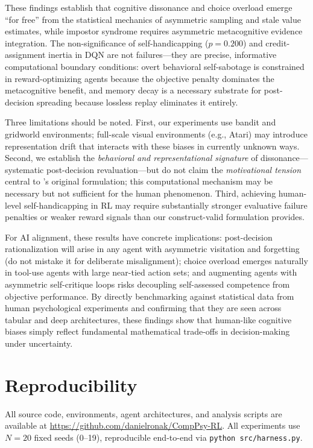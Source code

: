 \documentclass[conference]{IEEEtran}
\begin{document}
These findings establish that cognitive dissonance and choice overload emerge ``for free'' from the statistical mechanics of asymmetric sampling and stale value estimates, while impostor syndrome requires asymmetric metacognitive evidence integration. The non-significance of self-handicapping ($p=0.200$) and credit-assignment inertia in DQN are not failures---they are precise, informative computational boundary conditions: overt behavioral self-sabotage is constrained in reward-optimizing agents because the objective penalty dominates the metacognitive benefit, and memory decay is a necessary substrate for post-decision spreading because lossless replay eliminates it entirely.

Three limitations should be noted. First, our experiments use bandit and gridworld environments; full-scale visual environments (e.g., Atari) may introduce representation drift that interacts with these biases in currently unknown ways. Second, we establish the \textit{behavioral and representational signature} of dissonance---systematic post-decision revaluation---but do not claim the \textit{motivational tension} central to \citet{festinger1957theory}'s original formulation; this computational mechanism may be necessary but not sufficient for the human phenomenon. Third, achieving human-level self-handicapping in RL may require substantially stronger evaluative failure penalties or weaker reward signals than our construct-valid formulation provides.

For AI alignment, these results have concrete implications: post-decision rationalization will arise in any agent with asymmetric visitation and forgetting (do not mistake it for deliberate misalignment); choice overload emerges naturally in tool-use agents with large near-tied action sets; and augmenting agents with asymmetric self-critique loops risks decoupling self-assessed competence from objective performance. By directly benchmarking against statistical data from human psychological experiments and confirming that they are seen across tabular and deep architectures, these findings show that human-like cognitive biases simply reflect fundamental mathematical trade-offs in decision-making under uncertainty.

\section*{Reproducibility}
All source code, environments, agent architectures, and analysis scripts are available at \url{https://github.com/danielronak/CompPsy-RL}. All experiments use $N=20$ fixed seeds (0--19), reproducible end-to-end via \texttt{python src/harness.py}.



\end{document}
